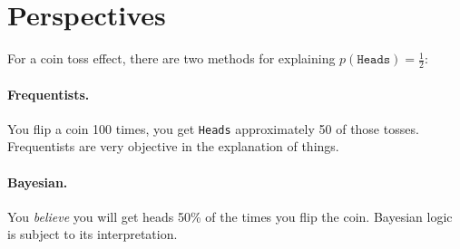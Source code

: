 \section{Perspectives}

For a coin toss effect, there are two methods for explaining $p(\texttt{Heads})=\frac{1}{2}$:

\paragraph{Frequentists.} 
You flip a coin 100 times, you get \texttt{Heads} approximately 50 of those tosses. 
Frequentists are very objective in the explanation of things. 

\paragraph{Bayesian.}
You \textit{believe} you will get heads 50\% of the times you flip the coin. 
Bayesian logic is subject to its interpretation. 


